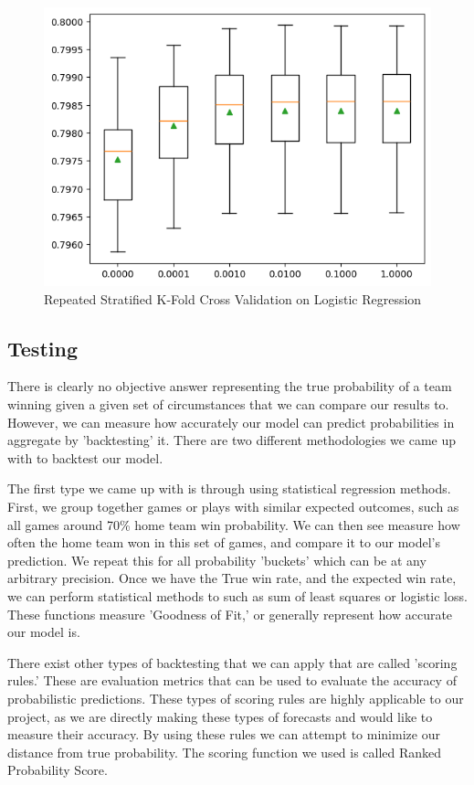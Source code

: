 \documentclass{article}
\begin{document}
\begin{figure}
    \centering
    \includegraphics[width=0.75\linewidth]{kfold.png}
    \caption{Repeated Stratified K-Fold Cross Validation on Logistic Regression}
    \label{fig:kfold}
\end{figure}

\subsection{Testing}
There is clearly no objective answer representing the true probability of a team winning given a given set of circumstances that we can compare our results to.
However, we can measure how accurately our model can predict probabilities in aggregate by 'backtesting' it.
There are two different methodologies we came up with to backtest our model. 

The first type we came up with is through using statistical regression methods. 
First, we group together games or plays with similar expected outcomes, such as all games around 70\% home team win probability. We can then see measure how often
the home team won in this set of games, and compare it to our model's prediction. We repeat this for all probability 'buckets' which can be at any arbitrary precision.
Once we have the True win rate, and the expected win rate, we can perform statistical methods to such as sum of least squares or logistic loss. These functions measure 'Goodness of Fit,' 
or generally represent how accurate our model is. 

There exist other types of backtesting that we can apply that are called 'scoring rules.' These are evaluation metrics that can be used to evaluate the accuracy of probabilistic predictions.
These types of scoring rules are highly applicable to our project, as we are directly making these types of forecasts and would like to measure their accuracy. By using these rules we can attempt to minimize our distance from true probability.
The scoring function we used is called Ranked Probability Score. 
\end{document}
